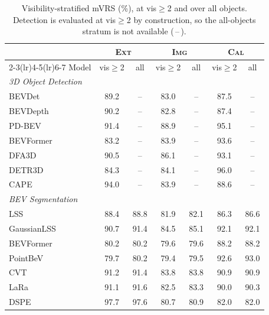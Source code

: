 \begin{table}[h]
\begin{minipage}[t]{0.48\textwidth}
\label{tab:supp_percam}
\end{minipage}\hfill
\begin{minipage}[t]{0.48\textwidth}\centering
\setlength{\tabcolsep}{4pt}
\begin{tabular}{l cc cc cc}
\toprule
& \multicolumn{2}{c}{\textsc{Ext}} & \multicolumn{2}{c}{\textsc{Img}} & \multicolumn{2}{c}{\textsc{Cal}}\\
\cmidrule(lr){2-3}\cmidrule(lr){4-5}\cmidrule(lr){6-7}
Model & vis$\geq$2 & all & vis$\geq$2 & all & vis$\geq$2 & all\\
\midrule
\multicolumn{7}{l}{\textit{3D Object Detection}}\\
\midrule
BEVDet    & 89.2 & -- & 83.0 & -- & 87.5 & --\\
BEVDepth  & 90.2 & -- & 82.8 & -- & 87.4 & --\\
PD-BEV    & 91.4 & -- & 88.9 & -- & 95.1 & --\\
\midrule
BEVFormer & 83.2 & -- & 83.9 & -- & 93.6 & --\\
DFA3D     & 90.5 & -- & 86.1 & -- & 93.1 & --\\
DETR3D    & 84.3 & -- & 84.1 & -- & 96.0 & --\\
\midrule
CAPE      & 94.0 & -- & 83.9 & -- & 88.6 & --\\
\midrule
\multicolumn{7}{l}{\textit{BEV Segmentation}}\\
\midrule
LSS         & 88.4 & 88.8 & 81.9 & 82.1 & 86.3 & 86.6\\
GaussianLSS & 90.7 & 91.4 & 84.5 & 85.1 & 92.1 & 92.1\\
\midrule
BEVFormer & 80.2 & 80.2 & 79.6 & 79.6 & 88.2 & 88.2\\
PointBeV  & 79.7 & 80.2 & 79.4 & 79.5 & 92.6 & 93.0\\
\midrule
CVT  & 91.2 & 91.4 & 83.8 & 83.8 & 90.9 & 90.9\\
LaRa & 91.1 & 91.6 & 82.5 & 83.3 & 90.0 & 90.3\\
DSPE & 97.7 & 97.6 & 80.7 & 80.9 & 82.0 & 82.0\\
\bottomrule
\end{tabular}
\caption{Visibility-stratified mVRS (\%), at vis$\geq$2 and over all objects. Detection is evaluated at vis$\geq$2 by construction, so the all-objects stratum is not available (\,--\,).}
\label{tab:supp_visibility}
\end{minipage}
\end{table}
